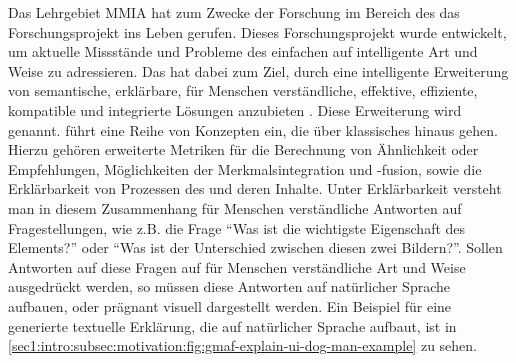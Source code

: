Das Lehrgebiet MMIA hat zum Zwecke der Forschung im Bereich des \mmir{} das Forschungsprojekt \gmafi{} ins Leben gerufen.
Dieses Forschungsprojekt wurde entwickelt, um aktuelle Missstände und Probleme des einfachen \mmir{} auf intelligente Art und Weise zu adressieren.
Das \gmaf{} hat dabei zum Ziel, durch eine intelligente Erweiterung von \mmir{} semantische, erklärbare, für Menschen verständliche, effektive, effiziente, kompatible und integrierte Lösungen anzubieten \cite[S.~20]{swa_diss}.
Diese Erweiterung wird \smmiri{} genannt.
\smmir{} führt eine Reihe von Konzepten ein, die über klassisches \mmir{} hinaus gehen.
Hierzu gehören erweiterte Metriken für die Berechnung von Ähnlichkeit oder Empfehlungen, Möglichkeiten der Merkmalsintegration und -fusion, sowie die Erklärbarkeit von Prozessen des \mmir{} und deren Inhalte.
Unter Erklärbarkeit versteht man in diesem Zusammenhang für Menschen verständliche Antworten auf Fragestellungen, wie z.B. die Frage \enquote{Was ist die wichtigste Eigenschaft des Elements?} oder \enquote{Was ist der Unterschied zwischen diesen zwei Bildern?}.
Sollen Antworten auf diese Fragen auf für Menschen verständliche Art und Weise ausgedrückt werden, so müssen diese Antworten auf natürlicher Sprache aufbauen, oder prägnant visuell dargestellt werden.
Ein Beispiel für eine generierte textuelle Erklärung, die auf natürlicher Sprache aufbaut, ist in \cref{sec1:intro:subsec:motivation:fig:gmaf-explain-ui-dog-man-example} zu sehen.
